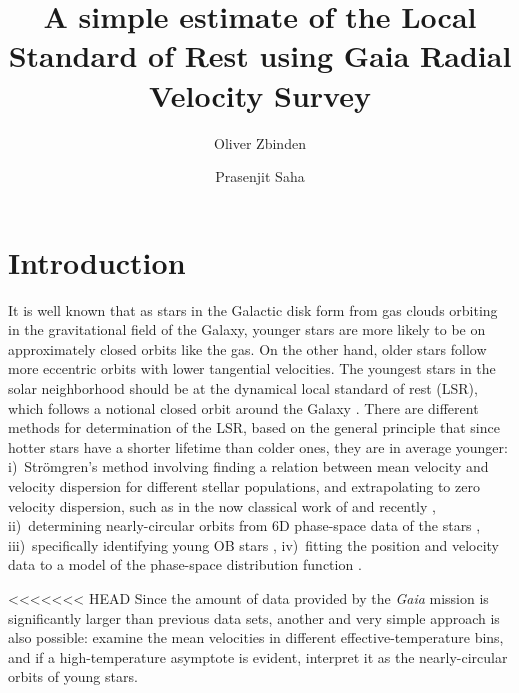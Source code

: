 \documentclass{aastex62}
\begin{document}
	
\title{A simple estimate of the Local Standard of Rest using Gaia Radial Velocity Survey}
	
	
	\author{Oliver Zbinden}
	
	
	\author{Prasenjit Saha}

	
\section{Introduction}\label{intro}
	
It is well known that as stars in the Galactic disk form from gas clouds orbiting in the gravitational field of the Galaxy, younger stars are more likely to be on approximately closed orbits like the gas. On the other hand, older stars follow more eccentric orbits with lower tangential velocities.  The youngest stars in the solar neighborhood should be at the dynamical local standard of rest (LSR), which follows a notional closed orbit around the Galaxy \citep[see e.g.,][]{shu,tayler,keel}.  There are different methods for determination of the LSR, based on the general principle that since hotter stars have a shorter lifetime than colder ones, they are in average younger:  i)~Str\"omgren's method involving finding a relation between mean velocity and velocity dispersion for different stellar populations, and extrapolating to zero velocity dispersion, such as in the now classical work of \cite{delhaye} and recently \cite{ding}, ii)~determining nearly-circular orbits from 6D phase-space data of the stars \citep{francis}, iii)~specifically identifying young OB stars \citep{boby}, iv)~fitting the position and velocity data to a model of the phase-space distribution function \citep{schoenrich}.

<<<<<<< HEAD
Since the amount of data provided by the \textit{Gaia} mission \citep{gaiamission} is significantly larger than previous data sets, another and very simple approach is also possible: examine the mean velocities in different effective-temperature bins, and if a high-temperature asymptote is evident, interpret it as the nearly-circular orbits of young stars.
	
\end{document}
